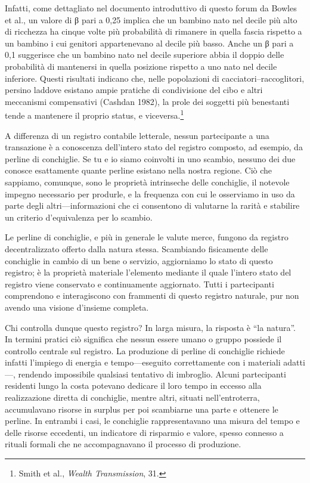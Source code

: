 \documentclass[
  a5paper,
  smalldemyvopaper,10pt,twoside,onecolumn,openright,extrafontsizes,hidelinks]{memoir}
\renewenvironment{quote}%
               {\list{}{\rightmargin=.6cm\leftmargin=.6cm}%
                \itshape \item[]}%
               {\endlist}
\begin{document}
\begin{quote}
Infatti, come dettagliato nel documento introduttivo di questo forum da
Bowles et al., un valore di β pari a 0,25 implica che un bambino nato
nel decile più alto di ricchezza ha cinque volte più probabilità di
rimanere in quella fascia rispetto a un bambino i cui genitori
appartenevano al decile più basso. Anche un β pari a 0,1 suggerisce che
un bambino nato nel decile superiore abbia il doppio delle probabilità
di mantenersi in quella posizione rispetto a uno nato nel decile
inferiore. Questi risultati indicano che, nelle popolazioni di
cacciatori--raccoglitori, persino laddove esistano ampie pratiche di
condivisione del cibo e altri meccanismi compensativi (Cashdan 1982), la
prole dei soggetti più benestanti tende a mantenere il proprio status, e
viceversa.\footnote{Smith et al., \emph{Wealth Transmission}, 31.}
\end{quote}

A differenza di un registro contabile letterale, nessun partecipante a
una transazione è a conoscenza dell'intero stato del registro composto,
ad esempio, da perline di conchiglie. Se tu e io siamo coinvolti in uno
scambio, nessuno dei due conosce esattamente quante perline esistano
nella nostra regione. Ciò che sappiamo, comunque, sono le proprietà
intrinseche delle conchiglie, il notevole impegno necessario per
produrle, e la frequenza con cui le osserviamo in uso da parte degli
altri---informazioni che ci consentono di valutarne la rarità e
stabilire un criterio d'equivalenza per lo scambio.

Le perline di conchiglie, e più in generale le valute merce, fungono da
registro decentralizzato offerto dalla natura stessa. Scambiando
fisicamente delle conchiglie in cambio di un bene o servizio,
aggiorniamo lo stato di questo registro; è la proprietà materiale
l'elemento mediante il quale l'intero stato del registro viene
conservato e continuamente aggiornato. Tutti i partecipanti comprendono
e interagiscono con frammenti di questo registro naturale, pur non
avendo una visione d'insieme completa.

Chi controlla dunque questo registro? In larga misura, la risposta è
``la natura''. In termini pratici ciò significa che nessun essere umano
o gruppo possiede il controllo centrale sul registro. La produzione di
perline di conchiglie richiede infatti l'impiego di energia e
tempo---eseguito correttamente con i materiali adatti---, rendendo
impossibile qualsiasi tentativo di imbroglio. Alcuni partecipanti
residenti lungo la costa potevano dedicare il loro tempo in eccesso alla
realizzazione diretta di conchiglie, mentre altri, situati
nell'entroterra, accumulavano risorse in surplus per poi scambiarne una
parte e ottenere le perline. In entrambi i casi, le conchiglie
rappresentavano una misura del tempo e delle risorse eccedenti, un
indicatore di risparmio e valore, spesso connesso a rituali formali che
ne accompagnavano il processo di produzione.
\end{document}
